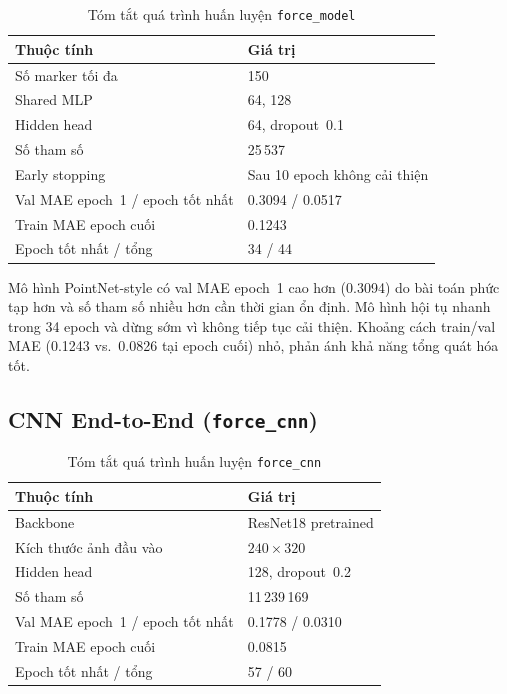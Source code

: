 \begin{table}[h]
\centering
\caption{Tóm tắt quá trình huấn luyện \texttt{force\_model}}
\label{tab:train_model}
\begin{tabular}{ll}
\toprule
\textbf{Thuộc tính} & \textbf{Giá trị} \\
\midrule
Số marker tối đa & 150 \\
Shared MLP & 64, 128 \\
Hidden head & 64, dropout~0.1 \\
Số tham số & 25\,537 \\
Early stopping & Sau 10 epoch không cải thiện \\
Val MAE epoch~1 / epoch tốt nhất & 0.3094 / 0.0517 \\
Train MAE epoch cuối & 0.1243 \\
Epoch tốt nhất / tổng & 34 / 44 \\
\bottomrule
\end{tabular}
\end{table}

Mô hình PointNet-style có val MAE epoch~1 cao hơn (0.3094) do bài toán phức
tạp hơn và số tham số nhiều hơn cần thời gian ổn định. Mô hình hội tụ nhanh
trong 34 epoch và dừng sớm vì không tiếp tục cải thiện. Khoảng cách
train/val MAE (0.1243 vs.\ 0.0826 tại epoch cuối) nhỏ, phản ánh khả năng
tổng quát hóa tốt.

\subsection{CNN End-to-End (\texttt{force\_cnn})}

\begin{table}[h]
\centering
\caption{Tóm tắt quá trình huấn luyện \texttt{force\_cnn}}
\label{tab:train_cnn}
\begin{tabular}{ll}
\toprule
\textbf{Thuộc tính} & \textbf{Giá trị} \\
\midrule
Backbone & ResNet18 pretrained \\
Kích thước ảnh đầu vào & $240 \times 320$ \\
Hidden head & 128, dropout~0.2 \\
Số tham số & 11\,239\,169 \\
Val MAE epoch~1 / epoch tốt nhất & 0.1778 / 0.0310 \\
Train MAE epoch cuối & 0.0815 \\
Epoch tốt nhất / tổng & 57 / 60 \\
\bottomrule
\end{tabular}
\end{table}


